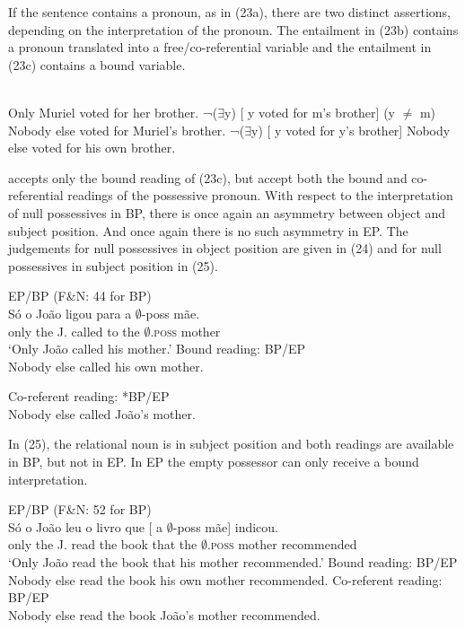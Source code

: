 \documentclass[output=paper]{langsci/langscibook}
\begin{document}
If the sentence contains a pronoun, as in (23a), there are two distinct assertions, depending on the interpretation of the pronoun. The entailment in (23b) contains a pronoun translated into a free\slash co-referential variable and the entailment in (23c) contains a bound variable.

\ea%
    \citet[98–99]{Horn1969}\label{ex:wein:23}\\
    \ea Only Muriel voted for her brother.
    \ex  ¬(${\exists}$y) [ y voted for m’s brother] (y ${\neq}$ m)  
    \glt Nobody else voted for Muriel’s brother.
    \ex ¬(${\exists}$y) [ y voted for y’s brother]
    \glt Nobody else voted for his own brother.
    \z
\z

\citet[102]{Horn1969} accepts only the bound reading of (23c), but \citet[197]{Boeckx2010} accept both the bound and co-referential readings of the possessive pronoun. With respect to the interpretation of null possessives in BP, there is once again an asymmetry between object and subject position. And once again there is no such asymmetry in EP. The judgements for null possessives in object position are given in (24) and for null possessives in subject position in (25).

\ea%
    EP\slash BP (F\&N: 44 for BP)\label{ex:wein:24}\\
    \ea 
    \gll Só o João ligou para a $\emptyset$-poss mãe.\\
         only the J. called to the $\emptyset$\textsc{.poss} mother\\
    \glt ‘Only João called his mother.’
    \ex Bound reading: BP\slash EP\\Nobody else called his own mother.
    
    \ex Co-referent reading: *BP\slash *EP\\Nobody else called João’s mother.
    \z
\z

In (25), the relational noun is in subject position and both readings are available in BP, but not in EP. In EP the empty possessor can only receive a bound interpretation.

\ea%
    EP\slash BP (F\&N: 52 for BP)\label{ex:wein:25}\\
    \ea 
    \gll Só o João leu o livro que [ a $\emptyset$-poss mãe] indicou.\\
         only the J. read the book that {} the $\emptyset$\textsc{.poss} mother recommended\\
    \glt ‘Only João read the book that his mother recommended.’
    \ex Bound reading: BP\slash EP\\Nobody else read the book his own mother recommended.
    \ex Co-referent reading: BP\slash *EP\\Nobody else read the book João’s mother recommended.
    \z
\z
\end{document}
